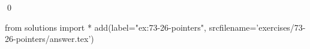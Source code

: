 
\begin{ex}
  \label{ex:73-26-pointers}
  
  \qed
\end{ex}
\begin{python0}
from solutions import *
add(label="ex:73-26-pointers",
    srcfilename='exercises/73-26-pointers/answer.tex')
\end{python0}
